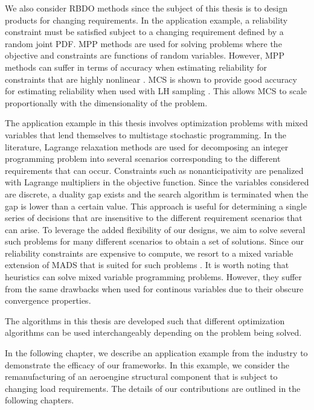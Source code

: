 We also consider \ac{RBDO} methods since the subject of this thesis is to design products for changing requirements. In the application example, a reliability constraint must be satisfied subject to a changing requirement defined by a random joint \ac{PDF}. \Ac{MPP} methods are used for solving problems where the objective and constraints are functions of random variables. However, \ac{MPP} methods can suffer in terms of accuracy when estimating reliability for constraints that are highly nonlinear \cite{Du2010}. \Ac{MCS} is shown to provide good accuracy for estimating reliability when used with \ac{LH} sampling \cite{Lehky2018}. This allows \ac{MCS} to scale proportionally with the dimensionality of the problem.

The application example in this thesis involves optimization problems with mixed variables that lend themselves to multistage stochastic programming. In the literature, Lagrange relaxation methods are used for decomposing an integer programming problem into several scenarios corresponding to the different requirements that can occur. Constraints such as nonanticipativity are penalized with Lagrange multipliers in the objective function. Since the variables considered are discrete, a duality gap exists and the search algorithm is terminated when the gap is lower than a certain value. This approach is useful for determining a single series of decisions that are insensitive to the different requirement scenarios that can arise. To leverage the added flexibility of our designs, we aim to solve several such problems for many different scenarios to obtain a set of solutions. Since our reliability constraints are expensive to compute, we resort to a mixed variable extension of \ac{MADS} that is suited for such problems \cite{Abramson2009}. It is worth noting that heuristics can solve mixed variable programming problems. However, they suffer from the same drawbacks when used for continous variables due to their obscure convergence properties.

The algorithms in this thesis are developed such that different optimization algorithms can be used interchangeably depending on the problem being solved.

In the following chapter, we describe an application example from the industry to demonstrate the efficacy of our frameworks. In this example, we consider the remanufacturing of an aeroengine structural component that is subject to changing load requirements. The details of our contributions are outlined in the following chapters.